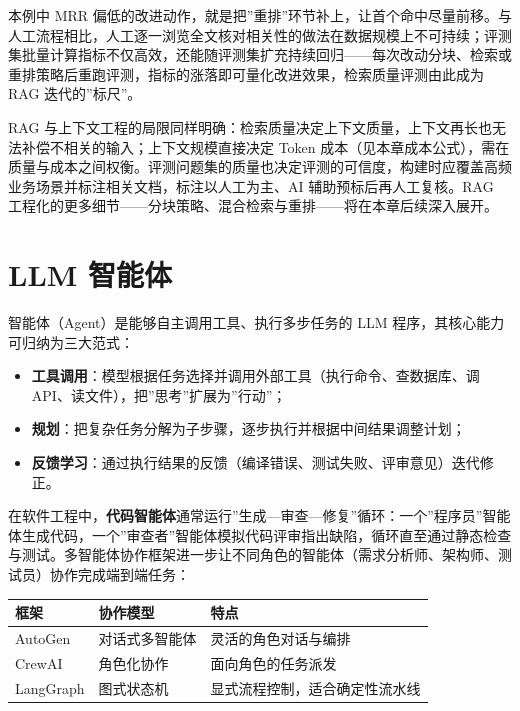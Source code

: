 \documentclass[
]{ctexbook}
\providecommand{\tightlist}{\setlength{\itemsep}{0pt}\setlength{\parskip}{0pt} }
\newcounter{none}
\begin{document}
本例中 MRR
偏低的改进动作，就是把''重排''环节补上，让首个命中尽量前移。与人工流程相比，人工逐一浏览全文核对相关性的做法在数据规模上不可持续；评测集批量计算指标不仅高效，还能随评测集扩充持续回归------每次改动分块、检索或重排策略后重跑评测，指标的涨落即可量化改进效果，检索质量评测由此成为
RAG 迭代的''标尺''。

RAG
与上下文工程的局限同样明确：检索质量决定上下文质量，上下文再长也无法补偿不相关的输入；上下文规模直接决定
Token
成本（见本章成本公式），需在质量与成本之间权衡。评测问题集的质量也决定评测的可信度，构建时应覆盖高频业务场景并标注相关文档，标注以人工为主、AI
辅助预标后再人工复核。RAG
工程化的更多细节------分块策略、混合检索与重排------将在本章后续深入展开。

\section{LLM 智能体}\label{llm-ux667aux80fdux4f53}

智能体（Agent）是能够自主调用工具、执行多步任务的 LLM
程序，其核心能力可归纳为三大范式：

\begin{itemize}
\tightlist
\item
  \textbf{工具调用}：模型根据任务选择并调用外部工具（执行命令、查数据库、调
  API、读文件），把''思考''扩展为''行动''；
\item
  \textbf{规划}：把复杂任务分解为子步骤，逐步执行并根据中间结果调整计划；
\item
  \textbf{反馈学习}：通过执行结果的反馈（编译错误、测试失败、评审意见）迭代修正。
\end{itemize}

在软件工程中，\textbf{代码智能体}通常运行''生成---审查---修复''循环：一个''程序员''智能体生成代码，一个''审查者''智能体模拟代码评审指出缺陷，循环直至通过静态检查与测试。多智能体协作框架进一步让不同角色的智能体（需求分析师、架构师、测试员）协作完成端到端任务：

{\def\LTcaptype{none} %
\begin{longtable}[]{@{}lll@{}}
\toprule\noalign{}
框架 & 协作模型 & 特点 \\
\midrule\noalign{}
\endhead
\bottomrule\noalign{}
\endlastfoot
AutoGen & 对话式多智能体 & 灵活的角色对话与编排 \\
CrewAI & 角色化协作 & 面向角色的任务派发 \\
LangGraph & 图式状态机 & 显式流程控制，适合确定性流水线 \\
\end{longtable}
}
\end{document}

